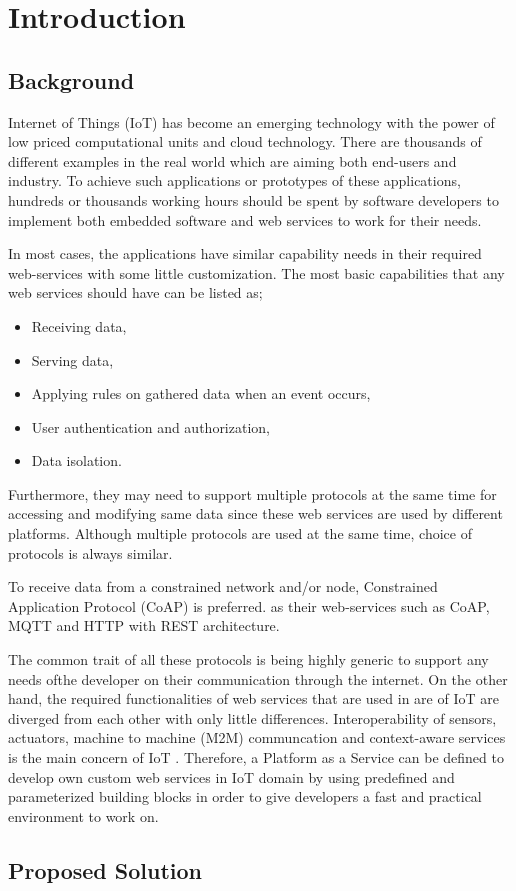 
\chapter{Introduction}\label{chapter:introduction}

\section{Background}
Internet of Things (IoT) has become an emerging technology with the power of low priced computational units and cloud technology. There are thousands of different examples in the real world which are aiming both end-users and industry. To achieve such applications or prototypes of these applications, hundreds or thousands working hours should be spent by software developers to implement both embedded software and web services to work for their needs. 

In most cases, the applications have similar capability needs in their required web-services with some little customization. The most basic capabilities that any web services should have can be listed as;
\begin{itemize}
  \item Receiving data,
  \item Serving data,
  \item Applying rules on gathered data when an event occurs,
  \item User authentication and authorization,
  \item Data isolation.
\end{itemize}
 Furthermore, they may need to support multiple protocols at the same time for accessing and modifying same data since these web services are used by different platforms. Although multiple protocols are used at the same time, choice of protocols is always similar. 

 To receive data from a constrained network and/or node, Constrained Application Protocol (CoAP) is preferred. as their web-services such as CoAP, MQTT and HTTP with REST architecture. 

 The common trait of all these protocols is being highly generic to support any needs ofthe developer on their communication through the internet. On the other hand, the required functionalities of web services that are used in are of IoT are diverged from each other with only little differences. Interoperability of sensors, actuators, machine to machine (M2M) communcation and context-aware services is the main concern of IoT \cite{6651222}. Therefore, a Platform as a Service can be defined to develop own custom web services in IoT domain by using predefined and parameterized building blocks in order to give developers a fast and practical environment to work on.

\section{Proposed Solution}


